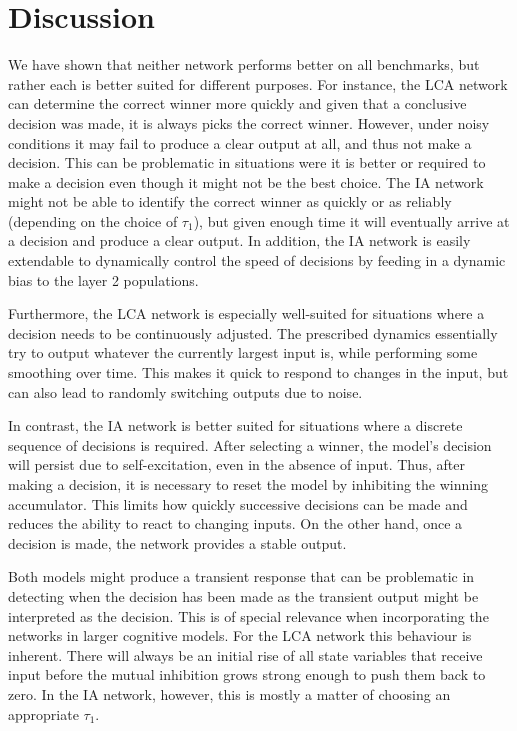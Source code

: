 \documentclass[10pt,letterpaper]{article}
\begin{document}
\section{Discussion}
We have shown that neither network performs better on all benchmarks, but rather each is better suited for different purposes.
For instance, the LCA network can determine the correct winner more quickly and given that a conclusive decision was made, it is always picks the correct winner.
However, under noisy conditions it may fail to produce a clear output at all, and thus not make a decision.
This can be problematic in situations were it is better or required to make a decision even though it might not be the best choice.
The IA network might not be able to identify the correct winner as quickly or as reliably (depending on the choice of $\tau_1$), but given enough time it will eventually arrive at a decision and produce a clear output.
In addition, the IA network is easily extendable to dynamically control the speed of decisions by feeding in a dynamic bias to the layer 2 populations.

Furthermore, the LCA network is especially well-suited for situations where a decision needs to be continuously adjusted.
The prescribed dynamics essentially try to output whatever the currently largest input is, while performing some smoothing over time.
This makes it quick to respond to changes in the input, but can also lead to randomly switching outputs due to noise.

In contrast, the IA network is better suited for situations where a discrete sequence of decisions is required.
After selecting a winner, the model's decision will persist due to self-excitation, even in the absence of input.
Thus, after making a decision, it is necessary to reset the model by inhibiting the winning accumulator.
This limits how quickly successive decisions can be made and reduces the ability to react to changing inputs.
On the other hand, once a decision is made, the network provides a stable output.

Both models might produce a transient response that can be problematic in detecting when the decision has been made as the transient output might be interpreted as the decision.
This is of special relevance when incorporating the networks in larger cognitive models.
For the LCA network this behaviour is inherent.
There will always be an initial rise of all state variables that receive input before the mutual inhibition grows strong enough to push them back to zero.
In the IA network, however, this is mostly a matter of choosing an appropriate $\tau_1$.
\end{document}
